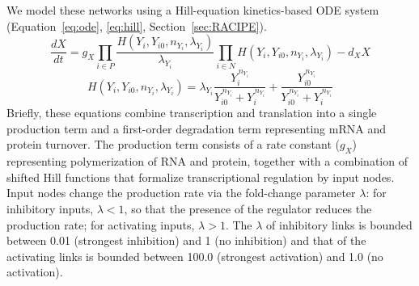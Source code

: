 \documentclass[11pt]{article}
\begin{document}
We model these networks using a Hill-equation kinetics-based ODE system (Equation~\ref{eq:ode}, \ref{eq:hill}, Section~\ref{sec:RACIPE}). 
\begin{equation}
\frac{dX}{dt} = g_X \prod_{i \in P} \frac{H(Y_i, Y_{i0}, n_{Y_i}, \lambda_{Y_i})}{\lambda_{Y_i}} \prod_{i \in N} H(Y_i, Y_{i0}, n_{Y_i}, \lambda_{Y_i}) - d_X X
\label{eq:ode}
\end{equation}
\begin{equation}
H(Y_i, Y_{i0}, n_{Y_i}, \lambda_{Y_i}) = \lambda_{Y_i} \frac{Y_i^{\,n_{Y_i}}}{Y_{i0}^{\,n_{Y_i}} + Y_i^{\,n_{Y_i}}} + \frac{Y_{i0}^{\,n_{Y_i}}}{Y_{i0}^{\,n_{Y_i}} + Y_i^{\,n_{Y_i}}}
\label{eq:hill}
\end{equation}
Briefly, these equations combine transcription and translation into a single production term and a first-order degradation term representing mRNA and protein turnover. The production term consists of a rate constant ($g_X$) representing polymerization of RNA and protein, together with a combination of shifted Hill functions that formalize transcriptional regulation by input nodes. Input nodes change the production rate via the fold-change parameter $\lambda$: for inhibitory inputs, $\lambda < 1$, so that the presence of the regulator reduces the production rate; for activating inputs, $\lambda > 1$. The $\lambda$ of inhibitory links is bounded between 0.01 (strongest inhibition) and 1 (no inhibition) and that of the activating links is bounded between 100.0 (strongest activation) and 1.0 (no activation). 
\end{document}
